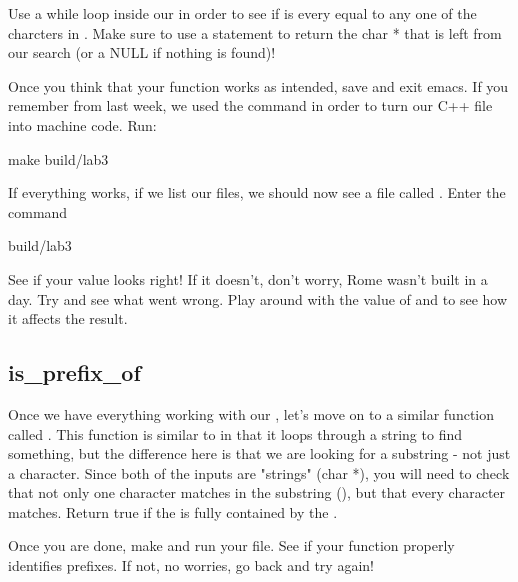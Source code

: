 \documentclass{tufte-handout}
\begin{document}
Use a while loop inside our  in order to see if  is every equal to any one of the charcters in .
Make sure to use a  statement to return the char * that is left from our search (or a NULL if nothing is found)!

Once you think that your function works as intended, save and exit emacs. If you remember from last week, we used the  command in order to turn our C++ file into machine code. Run:
\begin{CmdLine}
  \prompt make build/lab3
\end{CmdLine}
If everything works, if we list our files, we should now see a file called .  Enter the command
\begin{CmdLine}
  \prompt build/lab3
\end{CmdLine}
See if your value looks right!  If it doesn't, don't worry, Rome wasn't built in a day. Try and see what went wrong.  Play around with the value of  and  to see how it affects the result.

\subsection{is\_prefix\_of}

Once we have everything working with our , let's
move on to a similar function called
. This
function is similar to  in that it loops through a string to find something, but the difference here is that we are looking for a substring - not just a character. Since both of the inputs are "strings" (char *), you will need to check that not only one character matches in the substring (), but that every character matches. Return true if the  is fully contained by the .

Once you are done, make and run your file. See if your function properly identifies prefixes. If not, no worries, go back and try again!
\end{document}
